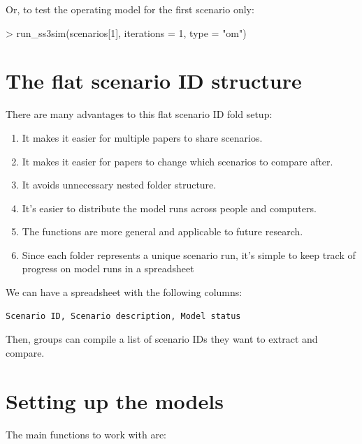 \documentclass[12pt]{article}
\begin{document}
\noindent
Or, to test the operating model for the first scenario only:

\begin{Schunk}
\begin{Sinput}
> run_ss3sim(scenarios[1], iterations = 1, type = "om")
\end{Sinput}
\end{Schunk}

\section*{The flat scenario ID structure}
There are many advantages to this flat scenario ID fold setup:

\begin{enumerate}
  \item It makes it easier for multiple papers to share scenarios.

  \item It makes it easier for papers to change which scenarios to compare after.

  \item It avoids unnecessary nested folder structure.

  \item It's easier to distribute the model runs across people and computers.

  \item The functions are more general and applicable to future research.

  \item Since each folder represents a unique scenario run, it's simple to keep track of progress on model runs in a spreadsheet
  
\end{enumerate}

\noindent
We can have a spreadsheet with the following columns:

\begin{verbatim}
Scenario ID, Scenario description, Model status
\end{verbatim}

\noindent
Then, groups can compile a list of scenario IDs they want to extract and compare.

\section*{Setting up the models}

The main functions to work with are:
\end{document}

